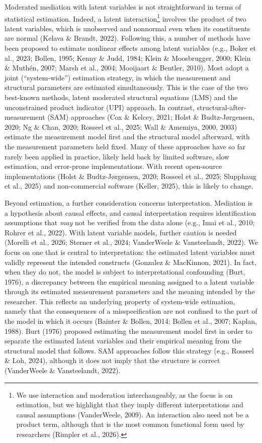 \documentclass[
  man,
  longtable,
  nolmodern,
  notxfonts,
  notimes,
  colorlinks=true,linkcolor=blue,citecolor=blue,urlcolor=blue]{apa7}
\begin{document}
Moderated mediation with latent variables is not straightforward in
terms of statistical estimation. Indeed, a latent interaction\footnote{We
  use interaction and moderation interchangeably, as the focus is on
  estimation, but we highlight that they imply different interpretations
  and causal assumptions (VanderWeele, 2009). An interaction also need
  not be a product term, although that is the most common functional
  form used by researchers (Rimpler et al., 2026).} involves the product
of two latent variables, which is unobserved and nonnormal even when its
constituents are normal (Kelava \& Brandt, 2022). Following this, a
number of methods have been proposed to estimate nonlinear effects among
latent variables (e.g., Boker et al., 2023; Bollen, 1995; Kenny \& Judd,
1984; Klein \& Moosbrugger, 2000; Klein \& Muthén, 2007; Marsh et al.,
2004; Mooijaart \& Bentler, 2010). Most adopt a joint (``system-wide'')
estimation strategy, in which the measurement and structural parameters
are estimated simultaneously. This is the case of the two best-known
methods, latent moderated structural equations (LMS) and the
unconstrained product indicator (UPI) approach. In contrast,
structural-after-measurement (SAM) approaches (Cox \& Kelcey, 2021;
Holst \& Budtz-Jørgensen, 2020; Ng \& Chan, 2020; Rosseel et al., 2025;
Wall \& Amemiya, 2000, 2003) estimate the measurement model first and
the structural model afterward, with the measurement parameters held
fixed. Many of these approaches have so far rarely been applied in
practice, likely held back by limited software, slow estimation, and
error-prone implementations. With recent open-source implementations
(Holst \& Budtz-Jørgensen, 2020; Rosseel et al., 2025; Slupphaug et al.,
2025) and non-commercial software (Keller, 2025), this is likely to
change.

Beyond estimation, a further consideration concerns interpretation.
Mediation is a hypothesis about causal effects, and causal
interpretation requires identification assumptions that \emph{may} not
be verified from the data alone (e.g., Imai et al., 2010; Rohrer et al.,
2022). With latent variable models, further caution is needed (Morelli
et al., 2026; Sterner et al., 2024; VanderWeele \& Vansteelandt, 2022).
We focus on one that is central to interpretation: the estimated latent
variables must validly represent the intended constructs (Gonzalez \&
MacKinnon, 2021). In fact, when they do not, the model is subject to
interpretational confounding (Burt, 1976), a discrepancy between the
empirical meaning assigned to a latent variable through its estimated
measurement parameters and the meaning intended by the researcher. This
reflects an underlying property of system-wide estimation, namely that
the consequences of a misspecification are not confined to the part of
the model in which it occurs (Bainter \& Bollen, 2014; Bollen et al.,
2007; Kaplan, 1988). Burt (1976) proposed estimating the measurement
model first in order to separate the estimated latent variables and
their empirical meaning from the structural model that follows. SAM
approaches follow this strategy (e.g., Rosseel \& Loh, 2024), although
it does not imply that the structure is correct (VanderWeele \&
Vansteelandt, 2022).
\end{document}
